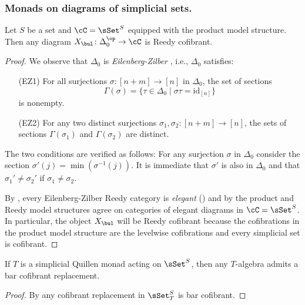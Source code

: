 \documentclass[leqno,oneside,english]{elsarticle}
\begin{document}
\subsubsection{Monads on diagrams of simplicial sets.}
\begin{lem}\label{lem:Delta0-Eilenberg-Zilber}
  Let $S$ be a set and $\cC = \sSet^{S}$ equipped with the product model
  structure.  Then any diagram $X_\bul \colon \Delta_0^{\op} \to \cC$ is
  Reedy cofibrant.
\end{lem}
\begin{proof}
  We observe that $\Delta_0$ is \emph{Eilenberg-Zilber}
  \cite[Def.~6]{BeR13}, i.e., $\Delta_0$ satisfies:
  \begin{enumerate}
  \item[(EZ1)] For all surjections $\sigma \colon [n+m] \to [n]$ in
    $\Delta_0$, the set of sections
    \[
    \Gamma(\sigma) = \{\tau \in \Delta_0 \;\big|\; \sigma\tau =
    \text{id}_{[n]} \}
    \]
    is nonempty.
  \item[(EZ2)] For any two distinct surjections $\sigma_1, \sigma_2 \colon
    [n+m] \to [n]$, the sets of sections $\Gamma(\sigma_1)$ and
    $\Gamma(\sigma_2)$ are distinct.
  \end{enumerate}
  The two conditions are verified as follows: For any surjection $\sigma$ in
  $\Delta_0$ consider the section $\sigma'(j) = \min (\sigma^{-1}(j))$.
  It is immediate that $\sigma'$ is also in $\Delta_0$ and that
  $\sigma_1' \neq \sigma_2'$ if $\sigma_1 \neq \sigma_2$.

  By \cite[Prop.~4.1]{BeR13}, every Eilenberg-Zilber Reedy category is
  \emph{elegant} (\cite[Def.~4]{BeR13}) and by
  \cite[Prop.~3.10]{BeR13} the product and Reedy model structures agree on
  categories of elegant diagrams in $\cC = \sSet^S$.  In particular,
  the object $X_\bul$ will be Reedy cofibrant because the cofibrations
  in the product model structure are the levelwise cofibrations and
  every simplicial set is cofibrant.
\end{proof}

\begin{prop}\label{prop:sset-resolvable}
  If $T$ is a simplicial Quillen monad acting on $\sSet^{S}$,
  then any $T$-algebra admits a bar cofibrant replacement.
\end{prop}
\begin{proof}
  By  any cofibrant replacement in $\sSet^{S}_{T}$ is bar cofibrant.
\end{proof}
\end{document}
